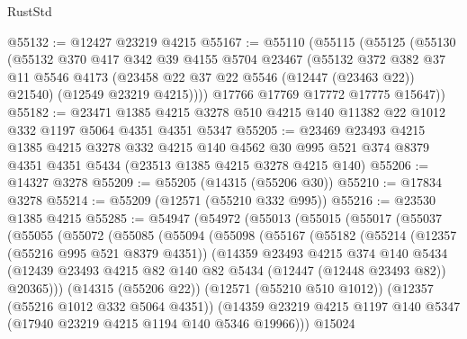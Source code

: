 \begin{lexlean}{RustStd}
\begin{coremodule}
@55132 := @12427 @23219 @4215
@55167 := @55110
    (@55115
      (@55125
        (@55130
          (@55132
            @370
            @417
            @342
            @39
            @4155
            @5704
            @23467
            (@55132
              @372
              @382
              @37
              @11
              @5546
              @4173
              (@23458 @22 @37 @22 @5546 (@12447 (@23463 @22)) @21540)
              (@12549 @23219 @4215))))
        @17766
        @17769
        @17772
        @17775
        @15647))
@55182 := @23471
    @1385
    @4215
    @3278
    @510
    @4215
    @140
    @11382
    @22
    @1012
    @332
    @1197
    @5064
    @4351
    @4351
    @5347
@55205 := @23469
    @23493
    @4215
    @1385
    @4215
    @3278
    @332
    @4215
    @140
    @4562
    @30
    @995
    @521
    @374
    @8379
    @4351
    @4351
    @5434
    (@23513 @1385 @4215 @3278 @4215 @140)
@55206 := @14327 @3278
@55209 := @55205 (@14315 (@55206 @30))
@55210 := @17834 @3278
@55214 := @55209 (@12571 (@55210 @332 @995))
@55216 := @23530 @1385 @4215
@55285 := @54947
    (@54972
      (@55013
        (@55015
          (@55017
            (@55037
              (@55055
                (@55072
                  (@55085
                    (@55094
                      (@55098
                        (@55167
                          (@55182
                            (@55214
                              (@12357 (@55216 @995 @521 @8379 @4351))
                              (@14359
                                @23493
                                @4215
                                @374
                                @140
                                @5434
                                (@12439
                                  @23493
                                  @4215
                                  @82
                                  @140
                                  @82
                                  @5434
                                  (@12447 (@12448 @23493 @82))
                                  @20365)))
                            (@14315 (@55206 @22))
                            (@12571 (@55210 @510 @1012))
                            (@12357 (@55216 @1012 @332 @5064 @4351))
                            (@14359
                              @23219
                              @4215
                              @1197
                              @140
                              @5347
                              (@17940 @23219 @4215 @1194 @140 @5346 @19966)))
                          @15024

\end{coremodule}
\end{lexlean}
